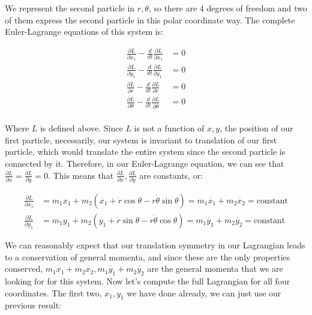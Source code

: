 \documentclass{article}
\numberwithin{equation}{section}
\begin{document}
We represent the second particle in $r, \theta$, so there are 4 degrees of freedom and two of them express the second particle in this polar coordinate way. The complete Euler-Lagrange equations of this system is:

\begin{equation}
    \begin{split}
        \frac{\partial L}{\partial x_1} - \frac{d}{dt} \frac{\partial L}{\partial \dot{x_1}} &= 0 \\ 
        \frac{\partial L}{\partial y_1} - \frac{d}{dt} \frac{\partial L}{\partial \dot{y_1}} &= 0 \\ 
        \frac{\partial L}{\partial r} - \frac{d}{dt} \frac{\partial L}{\partial \dot{r}} &= 0 \\ 
        \frac{\partial L}{\partial \theta} - \frac{d}{dt} \frac{\partial L}{\partial \dot{\theta}} &= 0 \\ 
    \end{split}
\end{equation}

Where $L$ is defined above. Since $L$ is not a function of $x, y$, the position of our first particle, necessarily, our system is invariant to translation of our first particle, which would translate the entire system since the second particle is connected by it. Therefore, in our Euler-Lagrange equation, we can see that $\frac{\partial L}{\partial x} = \frac{\partial L}{\partial y} = 0$. This means that $\frac{\partial L}{\partial \dot{x}}, \frac{\partial L}{\partial \dot{y}}$ are constants, or:

\begin{equation}
\begin{split}
        \frac{\partial L}{\partial x_1} &= m_1x_1 + m_2 (\dot{x_1} + \dot{r} \cos \theta - r \dot\theta \sin \theta) = m_1 \dot{x_1} + m_2 \dot{x_2} = \text{constant} \\
    \frac{\partial L}{\partial y_1} &= m_1y_1 + m_2 (\dot{y_1} + \dot{r} \sin \theta - r \dot\theta \cos \theta) = m_1 \dot{y_1} + m_2 \dot{y_2} =\text{constant}
\end{split}
\end{equation}

We can reasonably expect that our translation symmetry in our Lagrangian leads to a conservation of general momenta, and since these are the only properties conserved, $m_1 \dot{x_1} + m_2 \dot{x_2},  m_1 \dot{y_1} + m_2 \dot{y_2}$ are the general momenta that we are looking for for this system. Now let's compute the full Lagrangian for all four coordinates. The first two, $x_1, y_1$ we have done already, we can just use our previous result:
\end{document}
